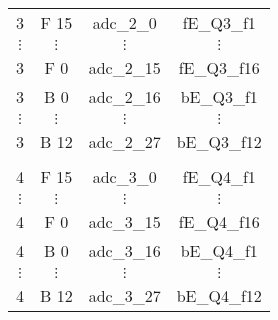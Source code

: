 \begin{tabular}{cccc}
3         &  F 15             				   				   &  adc\_2\_0    &  fE\_Q3\_f1   \\
$\vdots$  &  $\vdots$                  		   				   &  $\vdots$     &  $\vdots$     \\
3         &  F 0              				   				   &  adc\_2\_15   &  fE\_Q3\_f16  \\
3         &  B 0              				   				   &  adc\_2\_16   &  bE\_Q3\_f1   \\
$\vdots$  &  $\vdots$                  		   				   &  $\vdots$     &  $\vdots$     \\
3         &  B 12             				   				   &  adc\_2\_27   &  bE\_Q3\_f12  \\
          &                            		   				   &               &               \\
4         &  F 15             				   				   &  adc\_3\_0    &  fE\_Q4\_f1   \\
$\vdots$  &  $\vdots$                  		   				   &  $\vdots$     &  $\vdots$     \\
4         &  F 0              				   				   &  adc\_3\_15   &  fE\_Q4\_f16  \\
4         &  B 0              				   				   &  adc\_3\_16   &  bE\_Q4\_f1   \\
$\vdots$  &  $\vdots$                  		   				   &  $\vdots$     &  $\vdots$     \\
4         &  B 12             	 			   				   &  adc\_3\_27   &  bE\_Q4\_f12  \\
\hline
\end{tabular}